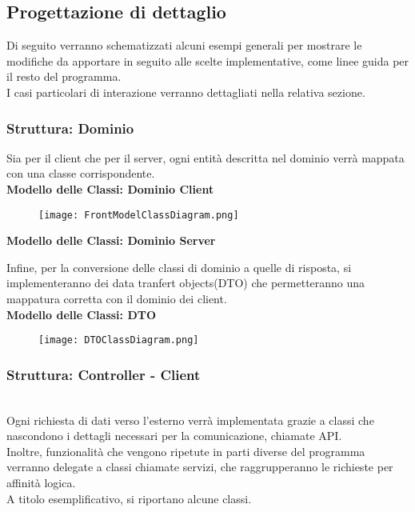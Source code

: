 \newpage
\subsection{Progettazione di dettaglio}

Di seguito verranno schematizzati alcuni esempi generali per mostrare le modifiche da apportare in seguito alle scelte implementative, come linee guida per il resto del programma.\\
I casi particolari di interazione verranno dettagliati nella relativa sezione.
\subsubsection{Struttura: Dominio}
Sia per il client che per il server, ogni entità descritta nel dominio verrà mappata con una classe corrispondente.\\
\textbf{Modello delle Classi: Dominio Client}\\
\begin{figure}[h!]
    \begin{center}
        \texttt{[image: FrontModelClassDiagram.png]}
    \end{center}
\end{figure}
\clearpage

\textbf{Modello delle Classi: Dominio Server}\\
\begin{figure}[h!]
    \centering
\end{figure}
\clearpage

Infine, per la conversione delle classi di dominio a quelle di risposta, si implementeranno dei data tranfert objects(DTO) che permetteranno una mappatura corretta con il dominio dei client.\\
\textbf{Modello delle Classi: DTO}\\
\begin{figure}[h!]
    \begin{center}
        \texttt{[image: DTOClassDiagram.png]}
    \end{center}
\end{figure}
\clearpage

\clearpage

\subsubsection{Struttura: Controller - Client}\mbox{}\\
Ogni richiesta di dati verso l'esterno verrà implementata grazie a classi che nascondono i dettagli necessari per la comunicazione, chiamate API.\\
Inoltre, funzionalità che vengono ripetute in parti diverse del programma verranno delegate a classi chiamate servizi, che raggrupperanno le richieste per affinità logica.\\
A titolo esemplificativo, si riportano alcune classi.\\

